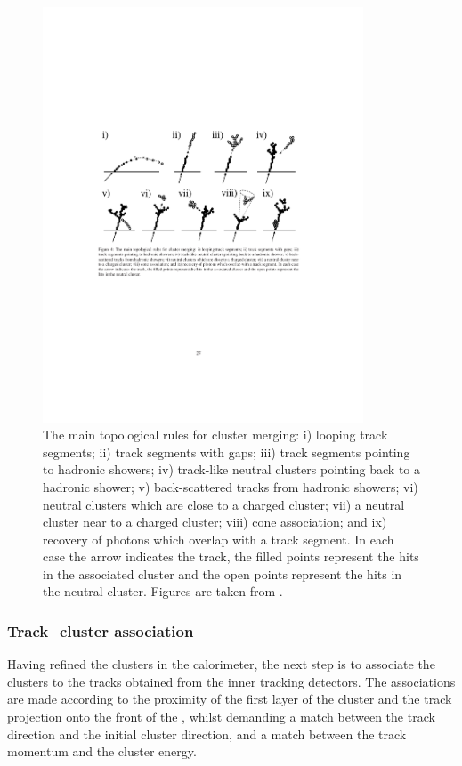 \begin{figure}[tbph]
\centering
    \includegraphics[width=0.85\textwidth]{pandora/topological}
\caption[Topological association in the \pandora.]
{The main topological rules for cluster merging:  i) looping track segments; ii) track segments with gaps; iii) track segments pointing to hadronic showers; iv) track-like neutral clusters pointing back to a hadronic shower; v) back-scattered tracks from hadronic showers; vi) neutral clusters which are close to a charged cluster; vii) a neutral cluster near to a charged cluster; viii) cone association; and ix) recovery of photons which overlap with a track segment. In each case the arrow indicates the track, the filled points represent the hits in the associated cluster and the open points represent the hits in the neutral cluster. Figures are taken from \cite{Thomson:2009rp}.}
\label{fig:pandoraTopoAsso}
\end{figure}

\subsubsection{Track$-$cluster association}

Having refined the clusters in the calorimeter, the next step is to associate the clusters to the tracks obtained from the inner tracking detectors. The associations  are made according to the proximity of the first layer of the cluster and the track projection onto the front of the \ECAL, whilst demanding a  match between the track direction and the initial cluster direction, and a match between the track momentum and the cluster energy.

